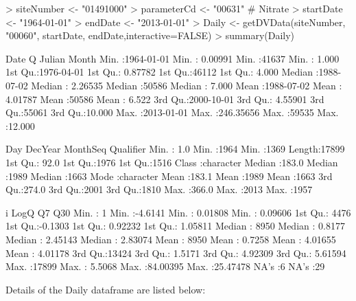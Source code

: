 \documentclass[a4paper,11pt]{article}
\begin{document}
\begin{Schunk}
\begin{Sinput}
> siteNumber <- "01491000"
> parameterCd <- "00631"  # Nitrate
> startDate <- "1964-01-01"
> endDate <- "2013-01-01"
> Daily <- getDVData(siteNumber, "00060", startDate, endDate,interactive=FALSE)
> summary(Daily)
\end{Sinput}
\begin{Soutput}
      Date                  Q                 Julian          Month       
 Min.   :1964-01-01   Min.   :  0.00991   Min.   :41637   Min.   : 1.000  
 1st Qu.:1976-04-01   1st Qu.:  0.87782   1st Qu.:46112   1st Qu.: 4.000  
 Median :1988-07-02   Median :  2.26535   Median :50586   Median : 7.000  
 Mean   :1988-07-02   Mean   :  4.01787   Mean   :50586   Mean   : 6.522  
 3rd Qu.:2000-10-01   3rd Qu.:  4.55901   3rd Qu.:55061   3rd Qu.:10.000  
 Max.   :2013-01-01   Max.   :246.35656   Max.   :59535   Max.   :12.000  
                                                                          
      Day           DecYear        MonthSeq     Qualifier        
 Min.   :  1.0   Min.   :1964   Min.   :1369   Length:17899      
 1st Qu.: 92.0   1st Qu.:1976   1st Qu.:1516   Class :character  
 Median :183.0   Median :1989   Median :1663   Mode  :character  
 Mean   :183.1   Mean   :1989   Mean   :1663                     
 3rd Qu.:274.0   3rd Qu.:2001   3rd Qu.:1810                     
 Max.   :366.0   Max.   :2013   Max.   :1957                     
                                                                 
       i              LogQ               Q7                Q30          
 Min.   :    1   Min.   :-4.6141   Min.   : 0.01808   Min.   : 0.09606  
 1st Qu.: 4476   1st Qu.:-0.1303   1st Qu.: 0.92232   1st Qu.: 1.05811  
 Median : 8950   Median : 0.8177   Median : 2.45143   Median : 2.83074  
 Mean   : 8950   Mean   : 0.7258   Mean   : 4.01655   Mean   : 4.01178  
 3rd Qu.:13424   3rd Qu.: 1.5171   3rd Qu.: 4.92309   3rd Qu.: 5.61594  
 Max.   :17899   Max.   : 5.5068   Max.   :84.00395   Max.   :25.47478  
                                   NA's   :6          NA's   :29        
\end{Soutput}
\end{Schunk}

Details of the Daily dataframe are listed below:
\end{document}
